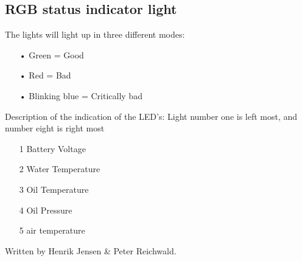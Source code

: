 \subsection*{RGB status indicator light}
The lights will light up in three different modes:
\begin{enumerate}
	\item[•]Green = Good
	\item[•]Red = Bad
	\item[•]Blinking blue = Critically bad
\end{enumerate}
Description of the indication of the LED's:
Light number one is left most, and number eight is right most
\begin{enumerate}
	\item[1] Battery Voltage
	\item[2] Water Temperature
	\item[3] Oil Temperature
	\item[4] Oil Pressure
	\item[5] air temperature
\end{enumerate}
Written by Henrik Jensen \& Peter Reichwald. 